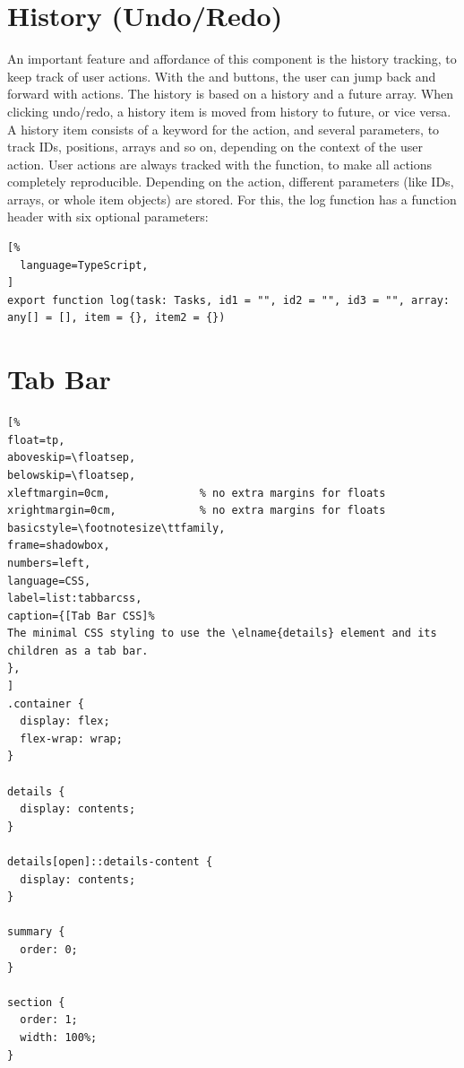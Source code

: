 \section{History (Undo/Redo)}

An important feature and affordance of this component is the history
tracking, to keep track of user actions. With the  and
 buttons, the user can jump back and forward with actions. 
%
The history is based on a history and a future array. When clicking
undo/redo, a history item is moved from history to future, or vice
versa. A history item consists of a keyword for the action, and several
parameters, to track IDs, positions, arrays and so on, depending on the
context of the user action. User actions are always tracked with the
 function, to make all actions completely
reproducible. Depending on the action, different parameters (like IDs,
arrays, or whole item objects) are stored. For this, the log function
has a function header with six optional parameters:
\begin{samepage}
\begin{lstlisting}[%
  language=TypeScript,
]
export function log(task: Tasks, id1 = "", id2 = "", id3 = "", array: any[] = [], item = {}, item2 = {})
\end{lstlisting}
\end{samepage}



\section{Tab Bar}

\begin{samepage}
\begin{lstlisting}[%
float=tp,
aboveskip=\floatsep,
belowskip=\floatsep,
xleftmargin=0cm,              % no extra margins for floats
xrightmargin=0cm,             % no extra margins for floats
basicstyle=\footnotesize\ttfamily,
frame=shadowbox,
numbers=left,
language=CSS,
label=list:tabbarcss,
caption={[Tab Bar CSS]%
The minimal CSS styling to use the \elname{details} element and its
children as a tab bar.
},
]
.container {
  display: flex;
  flex-wrap: wrap;
}

details {
  display: contents;
}

details[open]::details-content {
  display: contents;
}

summary {
  order: 0;
}

section {
  order: 1;
  width: 100%;
}
\end{lstlisting}
\end{samepage}


